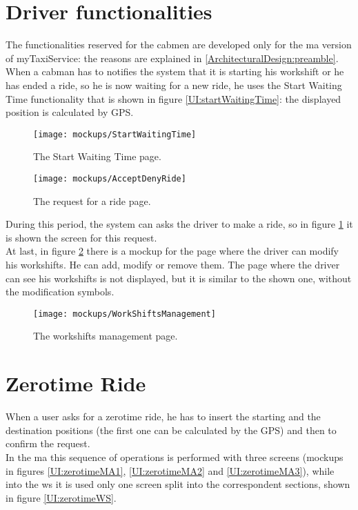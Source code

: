 \documentclass[\mainpath/main]{subfiles}
\begin{document}
\clearpage

\section{Driver functionalities}
The functionalities reserved for the cabmen are developed only for the \gls{ma} version of myTaxiService: the reasons are explained in \autoref{ArchitecturalDesign:preamble}. When a cabman has to notifies the system that it is starting his workshift or he has ended a ride, so he is now waiting for a new ride, he uses the Start Waiting Time functionality that is shown in figure \ref{UI:startWaitingTime}: the displayed position is calculated by GPS.\\

\begin{figure}[ht!]
	\centering
	\begin{minipage}[t]{0.45\textwidth}
		\centering
		\texttt{[image: mockups/StartWaitingTime]}
		\caption{The Start Waiting Time page.}
		\label{UI:startWaitingTime}
	\end{minipage}
	\hspace{0.05 cm}
	\begin{minipage}[t]{0.45\linewidth}
		\centering
		\texttt{[image: mockups/AcceptDenyRide]}
		\caption[The request for a ride to a driver page.]{The request for a ride page.}
		\label{UI:acceptDenyRide}
	\end{minipage}
\end{figure}

During this period, the system can asks the driver to make a ride, so in figure \ref{UI:acceptDenyRide} it is shown the screen for this request.\\
At last, in figure \ref{UI:workshift} there is a mockup for the page where the driver can modify his workshifts. He can add, modify or remove them. The page where the driver can see his workshifts is not displayed, but it is similar to the shown one, without the modification symbols.\\

\begin{figure}[ht!]
	\centering
	\texttt{[image: mockups/WorkShiftsManagement]}
	\caption{The workshifts management page.}
	\label{UI:workshift}
\end{figure}

\section{Zerotime Ride}
When a user asks for a zerotime ride, he has to insert the starting and the destination positions (the first one can be calculated by the GPS) and then to confirm the request.\\
In the \gls{ma} this sequence of operations is performed with three screens (mockups in figures \ref{UI:zerotimeMA1}, \ref{UI:zerotimeMA2} and \ref{UI:zerotimeMA3}), while into the \gls{ws} it is used only one screen split into the correspondent sections, shown in figure \ref{UI:zerotimeWS}.
\end{document}
